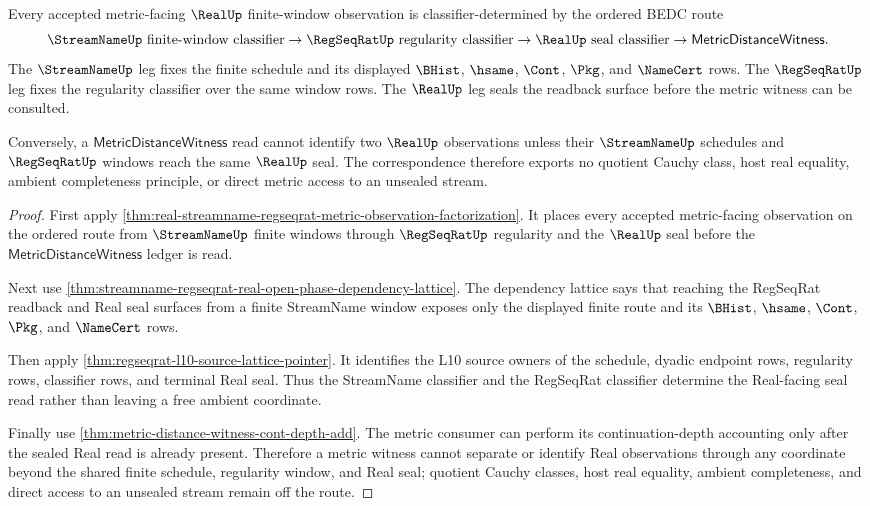 \begin{theorem}
\label{thm:real-streamname-regseqrat-metric-classifier-correspondence}
Every accepted metric-facing $\RealUp$ finite-window observation is
classifier-determined by the ordered BEDC route
$$
\StreamNameUp\text{ finite-window classifier}\to
\RegSeqRatUp\text{ regularity classifier}\to
\RealUp\text{ seal classifier}\to
\mathsf{MetricDistanceWitness}.
$$
The $\StreamNameUp$ leg fixes the finite schedule and its displayed $\BHist$,
$\hsame$, $\Cont$, $\Pkg$, and $\NameCert$ rows. The $\RegSeqRatUp$ leg fixes
the regularity classifier over the same window rows. The $\RealUp$ leg seals the
readback surface before the metric witness can be consulted.

Conversely, a $\mathsf{MetricDistanceWitness}$ read cannot identify two
$\RealUp$ observations unless their $\StreamNameUp$ schedules and
$\RegSeqRatUp$ windows reach the same $\RealUp$ seal. The correspondence
therefore exports no quotient Cauchy class, host real equality, ambient
completeness principle, or direct metric access to an unsealed stream.
\end{theorem}
\begin{proof}
First apply
\autoref{thm:real-streamname-regseqrat-metric-observation-factorization}. It
places every accepted metric-facing observation on the ordered route from
$\StreamNameUp$ finite windows through $\RegSeqRatUp$ regularity and the
$\RealUp$ seal before the $\mathsf{MetricDistanceWitness}$ ledger is read.

Next use
\autoref{thm:streamname-regseqrat-real-open-phase-dependency-lattice}. The
dependency lattice says that reaching the RegSeqRat readback and Real seal
surfaces from a finite StreamName window exposes only the displayed finite
route and its $\BHist$, $\hsame$, $\Cont$, $\Pkg$, and $\NameCert$ rows.

Then apply \autoref{thm:regseqrat-l10-source-lattice-pointer}. It identifies
the L10 source owners of the schedule, dyadic endpoint rows, regularity rows,
classifier rows, and terminal Real seal. Thus the StreamName classifier and the
RegSeqRat classifier determine the Real-facing seal read rather than leaving a
free ambient coordinate.

Finally use \autoref{thm:metric-distance-witness-cont-depth-add}. The metric
consumer can perform its continuation-depth accounting only after the sealed
Real read is already present. Therefore a metric witness cannot separate or
identify Real observations through any coordinate beyond the shared finite
schedule, regularity window, and Real seal; quotient Cauchy classes, host real
equality, ambient completeness, and direct access to an unsealed stream remain
off the route.
\end{proof}

